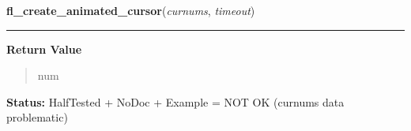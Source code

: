     \label{xformslib:library:fl_create_animated_cursor}

    \vspace{0.5ex}

\hspace{.8\funcindent}\begin{boxedminipage}{\funcwidth}

    \raggedright \textbf{fl\_create\_animated\_cursor}(\textit{curnums}, \textit{timeout})

    \vspace{-1.5ex}

    \rule{\textwidth}{0.5\fboxrule}
\setlength{\parskip}{2ex}
\setlength{\parskip}{1ex}
      \textbf{Return Value}
    \vspace{-1ex}

      \begin{quote}
      num

      \end{quote}

\textbf{Status:} HalfTested + NoDoc + Example = NOT OK (curnums data problematic)



    \end{boxedminipage}

    \label{xformslib:library:fl_get_cursor_byname}

    \vspace{0.5ex}

